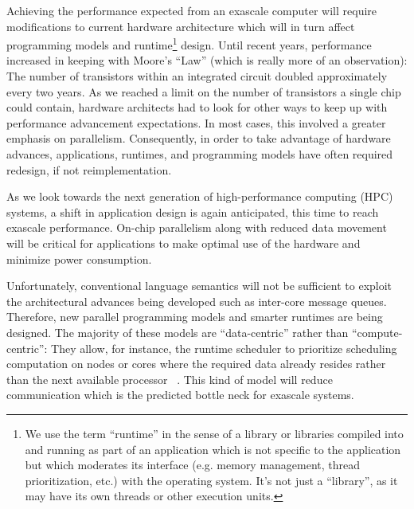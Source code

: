 \label{sec:introduction}
  
Achieving the performance expected from an exascale computer will
require modifications to current hardware architecture which will in
turn affect programming models and runtime\footnote{ %
  We use the term ``runtime'' in the sense of a library or libraries
  compiled into and running as part of an application which is not
  specific to the application but which moderates its interface (e.g.
  memory management, thread prioritization, etc.) with the operating
  system. It's not just a ``library'', as it may have its own threads
  or other execution units. %
} design. Until recent years, performance increased in keeping with
Moore's ``Law'' (which is really more of an observation): The number
of transistors within an integrated circuit doubled approximately
every two years. As we reached a limit on the number of transistors a
single chip could contain, hardware architects had to look for other
ways to keep up with performance advancement expectations. In most
cases, this involved a greater emphasis on parallelism. Consequently,
in order to take advantage of hardware advances, applications,
runtimes, and programming models have often required redesign, if not
reimplementation.

As we look towards the next generation of high-performance computing
(HPC) systems, a shift in application design is again anticipated,
this time to reach exascale performance. On-chip parallelism along
with reduced data movement will be critical for applications to make
optimal use of the hardware and minimize power consumption.

Unfortunately, conventional language semantics will not be sufficient
to exploit the architectural advances being developed such as
inter-core message queues. Therefore, new parallel programming models
and smarter runtimes are being designed. The majority of these models
are ``data-centric'' rather than ``compute-centric'': They allow, for
instance, the runtime scheduler to prioritize scheduling computation
on nodes or cores where the required data already resides rather than
the next available processor ~\cite{kogge2013exascale}. This kind of
model will reduce communication which is the predicted bottle neck for
exascale systems.

